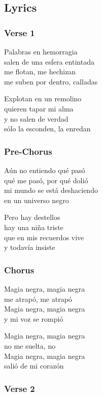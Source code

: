 \documentclass[]{article}
\begin{document}
\subsection{Lyrics}\label{lyrics-26}

\subsubsection{Verse 1}\label{verse-1-17}

Palabras en hemorragia\\
salen de una esfera entintada\\
me flotan, me hechizan\\
me suben por dentro, calladas

Explotan en un remolino\\
quieren tapar mi alma\\
y no salen de verdad\\
sólo la esconden, la enredan

\subsubsection{Pre-Chorus}\label{pre-chorus-28}

Aún no entiendo qué pasó\\
qué me pasó, por qué dolió\\
mi mundo se está deshaciendo\\
en un universo negro

Pero hay destellos\\
hay una niña triste\\
que en mis recuerdos vive\\
y todavía insiste

\subsubsection{Chorus}\label{chorus-45}

Magia negra, magia negra\\
me atrapó, me atrapó\\
Magia negra, magia negra\\
y mi voz se rompió

Magia negra, magia negra\\
no me suelta, no\\
Magia negra, magia negra\\
salió de mi corazón

\subsubsection{Verse 2}\label{verse-2-14}
\end{document}
